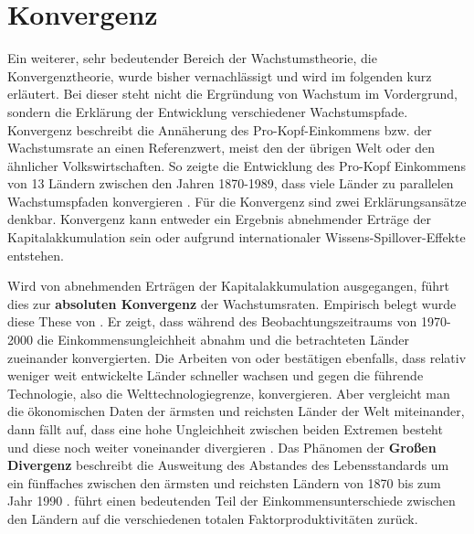 
\chapter{Konvergenz}
Ein weiterer, sehr bedeutender Bereich der Wachstumstheorie, die Konvergenztheorie, wurde bisher vernachl{\"a}ssigt und wird im folgenden kurz erl{\"a}utert. Bei dieser steht nicht die Ergr{\"u}ndung von Wachstum im Vordergrund, sondern die Erkl{\"a}rung der Entwicklung verschiedener Wachstumspfade.\\ Konvergenz beschreibt die Ann{\"a}herung des Pro-Kopf-Einkommens bzw. der Wachstumsrate an einen Referenzwert, meist den der {\"u}brigen Welt oder den {\"a}hnlicher Volkswirtschaften. So zeigte die Entwicklung des Pro-Kopf Einkommens von 13 L{\"a}ndern zwischen den Jahren 1870-1989, dass viele L{\"a}nder zu parallelen Wachstumspfaden konvergieren \citep{Evans.1996}. F{\"u}r die Konvergenz sind zwei Erkl{\"a}rungsans{\"a}tze denkbar. Konvergenz kann entweder ein Ergebnis abnehmender Ertr{\"a}ge der Kapitalakkumulation sein oder aufgrund internationaler Wissens-Spillover-Effekte entstehen. \newline


Wird von abnehmenden Ertr{\"a}gen der Kapitalakkumulation ausgegangen, f{\"u}hrt dies zur \textbf{absoluten Konvergenz} der Wachstumsraten. Empirisch belegt wurde diese These von \citet{SalaiMartin.2002}. Er zeigt, dass w{\"a}hrend des Beobachtungszeitraums von 1970-2000 die Einkommensungleichheit abnahm und die betrachteten L{\"a}nder zueinander konvergierten. Die Arbeiten von \citet{Mankiw.1992} oder \citet{Barro.1997} best{\"a}tigen ebenfalls, dass relativ weniger weit entwickelte L{\"a}nder schneller wachsen und gegen die f{\"u}hrende Technologie, also die Welttechnologiegrenze, konvergieren.
Aber vergleicht man die {\"o}konomischen Daten der {\"a}rmsten und reichsten L{\"a}nder der Welt miteinander, dann f{\"a}llt auf, dass eine hohe Ungleichheit zwischen beiden Extremen besteht und diese noch weiter voneinander divergieren \citep{Maddison.2001}. Das Ph{\"a}nomen der \textbf{Gro{\ss}en Divergenz} beschreibt die Ausweitung des Abstandes des Lebensstandards um ein f{\"u}nffaches zwischen den {\"a}rmsten und reichsten L{\"a}ndern von 1870  bis zum Jahr 1990 \citep{Pritchett.1997}. \citet{Helpman.2004} f{\"u}hrt einen bedeutenden Teil der Einkommensunterschiede zwischen den L{\"a}ndern auf die verschiedenen totalen Faktorproduktivit{\"a}ten zur{\"u}ck.\\


